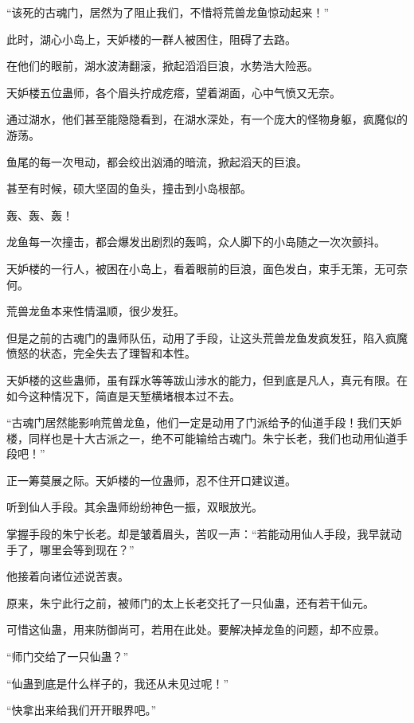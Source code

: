 
\begin{this_body}

“该死的古魂门，居然为了阻止我们，不惜将荒兽龙鱼惊动起来！”

此时，湖心小岛上，天妒楼的一群人被困住，阻碍了去路。

在他们的眼前，湖水波涛翻滚，掀起滔滔巨浪，水势浩大险恶。

天妒楼五位蛊师，各个眉头拧成疙瘩，望着湖面，心中气愤又无奈。

通过湖水，他们甚至能隐隐看到，在湖水深处，有一个庞大的怪物身躯，疯魔似的游荡。

鱼尾的每一次甩动，都会绞出汹涌的暗流，掀起滔天的巨浪。

甚至有时候，硕大坚固的鱼头，撞击到小岛根部。

轰、轰、轰！

龙鱼每一次撞击，都会爆发出剧烈的轰鸣，众人脚下的小岛随之一次次颤抖。

天妒楼的一行人，被困在小岛上，看着眼前的巨浪，面色发白，束手无策，无可奈何。

荒兽龙鱼本来性情温顺，很少发狂。

但是之前的古魂门的蛊师队伍，动用了手段，让这头荒兽龙鱼发疯发狂，陷入疯魔愤怒的状态，完全失去了理智和本性。

天妒楼的这些蛊师，虽有踩水等等跋山涉水的能力，但到底是凡人，真元有限。在如今这种情况下，简直是天堑横堵根本过不去。

“古魂门居然能影响荒兽龙鱼，他们一定是动用了门派给予的仙道手段！我们天妒楼，同样也是十大古派之一，绝不可能输给古魂门。朱宁长老，我们也动用仙道手段吧！”

正一筹莫展之际。天妒楼的一位蛊师，忍不住开口建议道。

听到仙人手段。其余蛊师纷纷神色一振，双眼放光。

掌握手段的朱宁长老。却是皱着眉头，苦叹一声：“若能动用仙人手段，我早就动手了，哪里会等到现在？”

他接着向诸位述说苦衷。

原来，朱宁此行之前，被师门的太上长老交托了一只仙蛊，还有若干仙元。

可惜这仙蛊，用来防御尚可，若用在此处。要解决掉龙鱼的问题，却不应景。

“师门交给了一只仙蛊？”

“仙蛊到底是什么样子的，我还从未见过呢！”

“快拿出来给我们开开眼界吧。”


\end{this_body}
